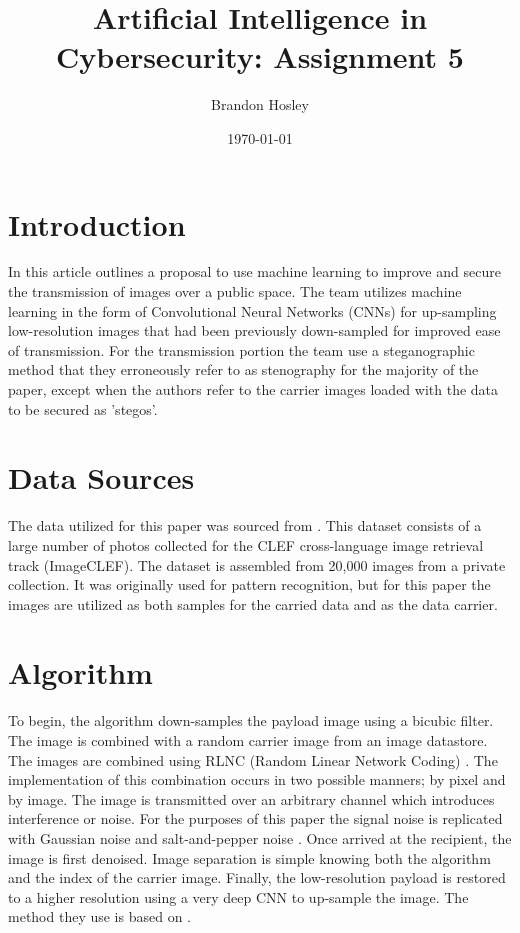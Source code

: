 \documentclass[]{article}
\title{Artificial Intelligence in Cybersecurity: Assignment 5}
\author{Brandon Hosley}
\date{\today}
\begin{document}
	\maketitle
	
\section{Introduction}

In this article \cite{Vien2021} outlines a proposal to use machine learning to improve and secure the transmission of images over a public space.
The team utilizes machine learning in the form of Convolutional Neural Networks (CNNs) for up-sampling low-resolution images that had been previously down-sampled for improved ease of transmission.
For the transmission portion the team use a steganographic method that they erroneously refer to as stenography for the majority of the paper, except when the authors refer to the carrier images loaded with the data to be secured as 'stegos'.

\section{Data Sources}

The data utilized for this paper was sourced from \cite{Grubinger2006}.
This dataset consists of a large number of photos collected for the 
CLEF cross-language image retrieval track (ImageCLEF).
The dataset is assembled from 20,000 images from a private collection.
It was originally used for pattern recognition, but for this paper the images are utilized as both samples for the carried data and as the data carrier.

\section{Algorithm}

To begin, the algorithm down-samples the payload image using a bicubic filter.
The image is combined with a random carrier image from an image datastore.
The images are combined using RLNC (Random Linear Network Coding) 
\cite{Koetter2003}.
The implementation of this combination occurs in two possible manners; 
by pixel and by image.
The image is transmitted over an arbitrary channel which introduces interference or noise.
For the purposes of this paper the signal noise is replicated with 
Gaussian noise \cite{ Zhang2017} and 
salt-and-pepper noise \cite{Chan2005}.
Once arrived at the recipient, the image is first denoised.
Image separation is simple knowing both the algorithm and the index of the carrier image.
Finally, the low-resolution payload is restored to a higher resolution using a very deep CNN to up-sample the image.
The method they use is based on \cite{Wang2020}.
\end{document}
